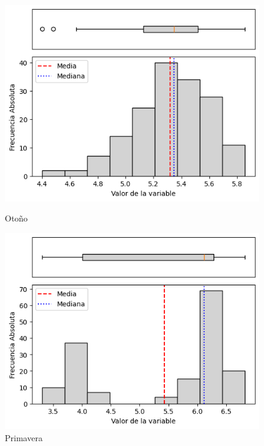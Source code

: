 \begin{figure}[H]
\centering
\begin{minipage}{0.30\textwidth}
    \centering
    \includegraphics[width=\linewidth]{resultados/por_estacion_del_anio/Ancachuro/PET_HistBoxplot_Autumn.png}
    \caption*{Otoño}
\end{minipage}
\hfill
\begin{minipage}{0.30\textwidth}
    \centering
    \includegraphics[width=\linewidth]{resultados/por_estacion_del_anio/Ancachuro/PET_HistBoxplot_Spring.png}
    \caption*{Primavera}
\end{minipage}
\vspace{0.3cm}
\begin{minipage}{0.30\textwidth}

\end{minipage}
\end{figure}
